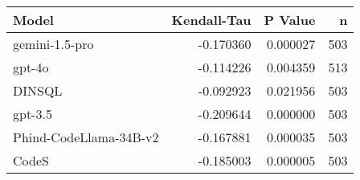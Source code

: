 \begin{tabular}{lrrr}
\toprule
Model & Kendall-Tau & P Value & n \\
\midrule
gemini-1.5-pro & -0.170360 & 0.000027 & 503 \\
gpt-4o & -0.114226 & 0.004359 & 513 \\
DINSQL & -0.092923 & 0.021956 & 503 \\
gpt-3.5 & -0.209644 & 0.000000 & 503 \\
Phind-CodeLlama-34B-v2 & -0.167881 & 0.000035 & 503 \\
CodeS & -0.185003 & 0.000005 & 503 \\
\bottomrule
\end{tabular}
